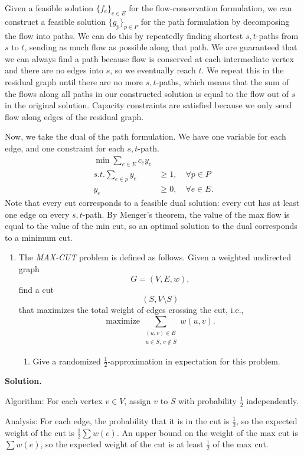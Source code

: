 \documentclass[11pt,letterpaper]{article}
\theoremstyle{definition}
\newcommand{\solution}{\medskip\noindent\textbf{Solution.}\par\medskip}
\begin{document}
Given a feasible solution $\{f_e\}_{e\in E}$ for the flow-conservation formulation, we can construct a feasible solution $\{g_p\}_{p\in P}$ for the path formulation by decomposing the flow into paths.
We can do this by repeatedly finding shortest $s,t$-paths from $s$ to $t$, sending as much flow as possible along that path.
We are guaranteed that we can always find a path because flow is conserved at each intermediate vertex and there are no edges into $s$, so we eventually reach $t$.
We repeat this in the residual graph until there are no more $s,t$-paths, which means that the sum of the flows along all paths in our constructed solution is equal to the flow out of $s$ in the original solution.
Capacity constraints are satisfied because we only send flow along edges of the residual graph.

Now, we take the dual of the path formulation.
We have one variable for each edge, and one constraint for each $s,t$-path.
\begin{align*}
    \min \sum_{e\in E} c_e y_e \\
    s.t. \sum_{e\in p} y_e &\geq 1,\quad \forall p \in P \\
    y_e &\geq 0,\quad \forall e \in E.
\end{align*}
Note that every cut corresponds to a feasible dual solution: every cut has at least one edge on every $s,t$-path.
By Menger's theorem, the value of the max flow is equal to the value of the min cut, so an optimal solution to the dual corresponds to a minimum cut.



\begin{enumerate}[resume=q]
\item The \emph{MAX-CUT} problem is defined as follows. Given a weighted undirected graph
\[
G = (V, E, w),
\]
find a cut
\[
(S, V \setminus S)
\]
that maximizes the total weight of edges crossing the cut, i.e.,
\[
\text{maximize}\ \sum_{\substack{(u,v) \in E \\ u \in S,\, v \notin S}} w(u,v).
\]
\begin{enumerate}
\item Give a randomized $\frac{1}{2}$-approximation in expectation for this problem.
\end{enumerate}
\end{enumerate}

\solution
Algorithm: For each vertex $v\in V$, assign $v$ to $S$ with probability $\frac{1}{2}$ independently.

Analysis: For each edge, the probability that it is in the cut is $\frac{1}{2}$, so the expected weight of the cut is $\frac{1}{2}\sum w(e)$.
An upper bound on the weight of the max cut is $\sum w(e)$, so the expected weight of the cut is at least $\frac{1}{2}$ of the max cut.
\end{document}
